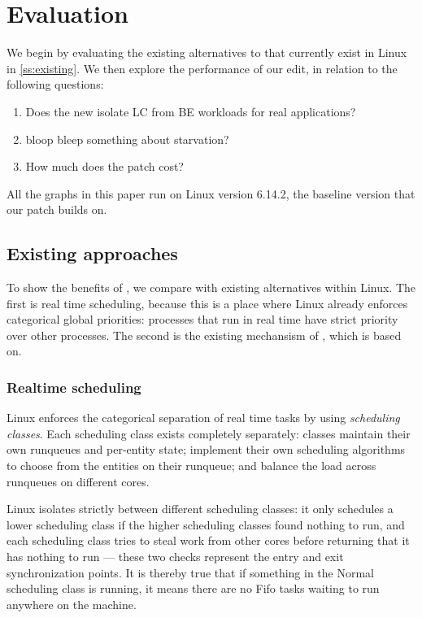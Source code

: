 \section{Evaluation}
\label{s:eval}

We begin by evaluating the existing alternatives to \cgroups{} that currently
exist in Linux in \autoref{ss:existing}. We then explore the performance of our
edit, in relation to the following questions:
\begin{enumerate}
    \item Does the new \schedbe{} isolate LC from BE workloads for real
    applications?
    \item bloop bleep something about starvation?
    \item How much does the patch cost?
\end{enumerate}

All the graphs in this paper run on Linux version 6.14.2, the baseline version
that our patch builds on.

\subsection{Existing approaches}\label{ss:existing}

To show the benefits of \schedbe{}, we compare with existing alternatives within
Linux. The first is real time scheduling, because this is a place where Linux
already enforces categorical global priorities: processes that run in real time
have strict priority over other processes. The second is the existing mechansism
of \schedidle{}, which \schedbe{} is based on.

\subsubsection{Realtime scheduling}

Linux enforces the categorical separation of real time tasks by using
\textit{scheduling classes}. Each scheduling class exists completely separately:
classes maintain their own runqueues and per-entity state; implement their own
scheduling algorithms to choose from the entities on their runqueue; and balance
the load across runqueues on different cores.

Linux isolates strictly between different scheduling classes: it only schedules
a lower scheduling class if the higher scheduling classes found nothing to run,
and each scheduling class tries to steal work from other cores before returning
that it has nothing to run --- these two checks represent the entry and exit
synchronization points. It is thereby true that if something in the Normal
scheduling class is running, it means there are no Fifo tasks waiting to run
anywhere on the machine.

